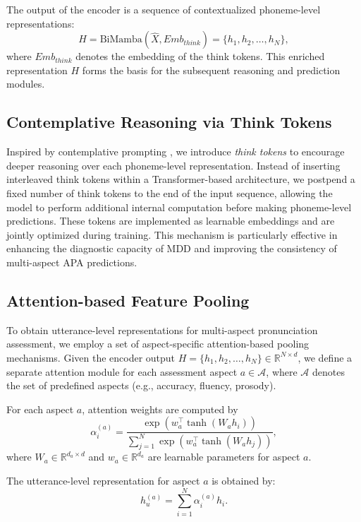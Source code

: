 \documentclass{Interspeech}
\begin{document}
The output of the encoder is a sequence of contextualized phoneme-level representations:
\begin{equation}
    H = \mathrm{BiMamba}(\hat{X}, Emb_{think}) = \{h_1, h_2, \ldots, h_N\}, 
\end{equation}
where $Emb_{think}$ denotes the embedding of the think tokens.
This enriched representation $H$ forms the basis for the subsequent reasoning and prediction modules.


\subsection{Contemplative Reasoning via Think Tokens}
\label{sec:contemplative_reasoning}
Inspired by contemplative prompting \cite{yang2024contemplative}, we introduce \textit{think tokens} to encourage deeper reasoning over each phoneme-level representation. 
Instead of inserting interleaved think tokens within a Transformer-based architecture, we postpend a fixed number of think tokens to the end of the input sequence, allowing the model to perform additional internal computation before making phoneme-level predictions. These tokens are implemented as learnable embeddings and are jointly optimized during training. This mechanism is particularly effective in enhancing the diagnostic capacity of MDD and improving the consistency of multi-aspect APA predictions.


\subsection{Attention-based Feature Pooling}
To obtain utterance-level representations for multi-aspect pronunciation assessment, we employ a set of aspect-specific attention-based pooling mechanisms. Given the encoder output $H = \{h_1, h_2, \ldots, h_N\} \in \mathbb{R}^{N \times d}$, we define a separate attention module for each assessment aspect $a \in \mathcal{A}$, where $\mathcal{A}$ denotes the set of predefined aspects (e.g., accuracy, fluency, prosody).

For each aspect $a$, attention weights are computed by
\begin{equation}
    \alpha_i^{(a)} = \frac{\exp\left(w_a^\top \tanh(W_a h_i)\right)}{\sum_{j=1}^{N} \exp\left(w_a^\top \tanh(W_a h_j)\right)},
\end{equation}
where $W_a \in \mathbb{R}^{d_a \times d}$ and $w_a \in \mathbb{R}^{d_a}$ are learnable parameters for aspect $a$.

The utterance-level representation for aspect $a$ is obtained by:
\begin{equation}
    h_u^{(a)} = \sum_{i=1}^{N} \alpha_i^{(a)} h_i.
\end{equation}
\end{document}
